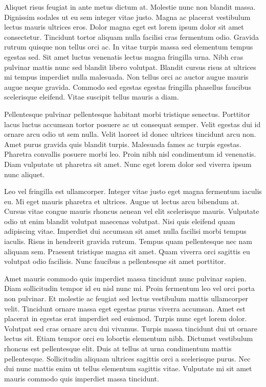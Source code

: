 \documentclass[runningheads]{llncs}
\begin{document}
Aliquet risus feugiat in ante metus dictum at. Molestie nunc non blandit massa. Dignissim sodales ut eu sem integer vitae justo. Magna ac placerat vestibulum lectus mauris ultrices eros. Dolor magna eget est lorem ipsum dolor sit amet consectetur. Tincidunt tortor aliquam nulla facilisi cras fermentum odio. Gravida rutrum quisque non tellus orci ac. In vitae turpis massa sed elementum tempus egestas sed. Sit amet luctus venenatis lectus magna fringilla urna. Nibh cras pulvinar mattis nunc sed blandit libero volutpat. Blandit cursus risus at ultrices mi tempus imperdiet nulla malesuada. Non tellus orci ac auctor augue mauris augue neque gravida. Commodo sed egestas egestas fringilla phasellus faucibus scelerisque eleifend. Vitae suscipit tellus mauris a diam.

Pellentesque pulvinar pellentesque habitant morbi tristique senectus. Porttitor lacus luctus accumsan tortor posuere ac ut consequat semper. Velit egestas dui id ornare arcu odio ut sem nulla. Velit laoreet id donec ultrices tincidunt arcu non. Amet purus gravida quis blandit turpis. Malesuada fames ac turpis egestas. Pharetra convallis posuere morbi leo. Proin nibh nisl condimentum id venenatis. Diam vulputate ut pharetra sit amet. Nunc eget lorem dolor sed viverra ipsum nunc aliquet.

Leo vel fringilla est ullamcorper. Integer vitae justo eget magna fermentum iaculis eu. Mi eget mauris pharetra et ultrices. Augue ut lectus arcu bibendum at. Cursus vitae congue mauris rhoncus aenean vel elit scelerisque mauris. Vulputate odio ut enim blandit volutpat maecenas volutpat. Nisi quis eleifend quam adipiscing vitae. Imperdiet dui accumsan sit amet nulla facilisi morbi tempus iaculis. Risus in hendrerit gravida rutrum. Tempus quam pellentesque nec nam aliquam sem. Praesent tristique magna sit amet. Quam viverra orci sagittis eu volutpat odio facilisis. Nunc faucibus a pellentesque sit amet porttitor.

Amet mauris commodo quis imperdiet massa tincidunt nunc pulvinar sapien. Diam sollicitudin tempor id eu nisl nunc mi. Proin fermentum leo vel orci porta non pulvinar. Et molestie ac feugiat sed lectus vestibulum mattis ullamcorper velit. Tincidunt ornare massa eget egestas purus viverra accumsan. Amet est placerat in egestas erat imperdiet sed euismod. Turpis nunc eget lorem dolor. Volutpat sed cras ornare arcu dui vivamus. Turpis massa tincidunt dui ut ornare lectus sit. Etiam tempor orci eu lobortis elementum nibh. Dictumst vestibulum rhoncus est pellentesque elit. Duis at tellus at urna condimentum mattis pellentesque. Sollicitudin aliquam ultrices sagittis orci a scelerisque purus. Nec dui nunc mattis enim ut tellus elementum sagittis vitae. Vulputate mi sit amet mauris commodo quis imperdiet massa tincidunt.
\end{document}
